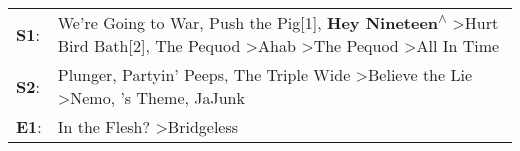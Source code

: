 \begin{supertabular}{p{0.03\textwidth}p{0.92\textwidth}}
 \textbf{S1}:  &  We're Going to War\textsuperscript{}, \enspace Push the Pig[1]\textsuperscript{}, \enspace \textbf{Hey Nineteen\textsuperscript{$\wedge$}} \textgreater \enspace Hurt Bird Bath[2]\textsuperscript{}, \enspace The Pequod\textsuperscript{} \textgreater \enspace Ahab\textsuperscript{} \textgreater \enspace The Pequod\textsuperscript{} \textgreater \enspace All In Time\textsuperscript{}  \enspace  \\
 \textbf{S2}:  &                                                                                                  Plunger\textsuperscript{}, \enspace Partyin' Peeps\textsuperscript{}, \enspace The Triple Wide\textsuperscript{} \textgreater \enspace Believe the Lie\textsuperscript{} \textgreater \enspace Nemo\textsuperscript{}, 's Theme\textsuperscript{}, \enspace JaJunk\textsuperscript{}  \enspace  \\
 \textbf{E1}:  &                                                                                                                                                                                                                                                                                                               In the Flesh?\textsuperscript{} \textgreater \enspace Bridgeless\textsuperscript{}  \enspace  \\
\end{supertabular}
